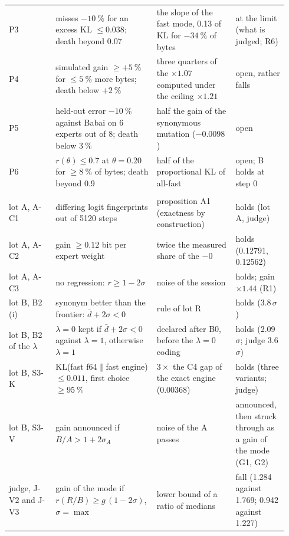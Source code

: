 \begin{longtable}{@{}>{\raggedright\arraybackslash}p{0.16\linewidth}>{\raggedright\arraybackslash}p{0.33\linewidth}>{\raggedright\arraybackslash}p{0.27\linewidth}>{\raggedright\arraybackslash}p{0.18\linewidth}@{}}
P3 & misses $-\SI{10}{\percent}$ for an excess KL $\le \num{0.038}$; death beyond \num{0.07} & the slope of the fast mode, 0.13 of KL for $-\SI{34}{\percent}$ of bytes & at the limit (what is judged; R6) \\
P4 & simulated gain $\ge +\SI{5}{\percent}$ for $\le \SI{5}{\percent}$ more bytes; death below $+\SI{2}{\percent}$ & three quarters of the $\times 1.07$ computed under the ceiling $\times 1.21$ & open, rather falls \\
P5 & held-out error $-\SI{10}{\percent}$ against Babai on 6 experts out of 8; death below $\SI{3}{\percent}$ & half the gain of the synonymous mutation ($-0.0098$) & open \\
P6 & $r(\theta) \le 0.7$ at $\theta = 0.20$ for $\ge \SI{8}{\percent}$ of bytes; death beyond 0.9 & half of the proportional KL of all-fast & open; B holds at step 0 \\
\multicolumn{4}{@{}l}{\textsf{\bfseries The construction (ch.~\ref{t3cod:ch} to~\ref{t3jug:ch})}} \\
lot A, A-C1 & 0 differing logit fingerprints out of \num{5120} steps & proposition A1 (exactness by construction) & holds (lot A, judge) \\
lot A, A-C2 & gain $\ge \num{0.12}$ bit per expert weight & twice the measured share of the $-0$ & holds (\num{0.12791}, \num{0.12562}) \\
lot A, A-C3 & no regression: $r \ge 1 - 2\sigma$ & noise of the session & holds; gain $\times 1.44$ (R1) \\
lot B, B2 (i) & synonym better than the frontier: $\bar d + 2\sigma < 0$ & rule of lot R & holds (\num{3.8}\,$\sigma$) \\
lot B, B2 of the $\lambda$ & $\lambda = 0$ kept if $\bar d + 2\sigma < 0$ against $\lambda = 1$, otherwise $\lambda = 1$ & declared after B0, before the $\lambda = 0$ coding & holds (\num{2.09}\,$\sigma$; judge \num{3.6}\,$\sigma$) \\
lot B, S3-K & KL(fast f64 $\Vert$ fast engine) $\le \num{0.011}$, first choice $\ge \SI{95}{\percent}$ & $3 \times$ the C4 gap of the exact engine (\num{0.00368}) & holds (three variants; judge) \\
lot B, S3-V & gain announced if $B/A > 1 + 2\sigma_A$ & noise of the A passes & announced, then struck through as a gain of the mode (G1, G2) \\
judge, J-V2 and J-V3 & gain of the mode if $r(R/B) \ge g\,(1 - 2\sigma)$, $\sigma = \max$ & lower bound of a ratio of medians & fall (\num{1.284} against \num{1.769}; \num{0.942} against \num{1.227}) \\

\end{longtable}
